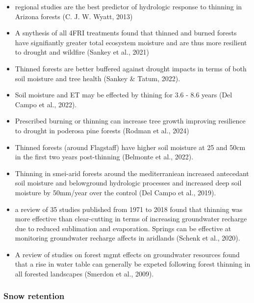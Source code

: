 \documentclass[
]{agujournal2019}
\begin{document}
\begin{itemize}
\item
  regional studies are the best predictor of hydrologic response to
  thinning in Arizona forests (C. J. W. Wyatt, 2013)
\item
  A snythesis of all 4FRI treatments found that thinned and burned
  forests have signifiantly greater total ecosystem moisture and are
  thus more resilient to drought and wildfire (Sankey et al., 2021)
\item
  Thinned forests are better buffered against drought impacts in terms
  of both soil moisture and tree health (Sankey \& Tatum, 2022).
\item
  Soil moisture and ET may be effected by thining for 3.6 - 8.6 years
  (Del Campo et al., 2022).
\item
  Prescribed burning or thinning can increase tree growth improving
  resilience to drought in poderosa pine forests (Rodman et al., 2024)
\item
  Thinned forests (around Flagstaff) have higher soil moisture at 25 and
  50cm in the first two years post-thinning (Belmonte et al., 2022).
\item
  Thinning in smei-arid forests around the mediterraniean increased
  antecedant soil moisture and belowground hydrologic processes and
  increased deep soil moisture by 50mm/year over the control (Del Campo
  et al., 2019).
\item
  a review of 35 studies published from 1971 to 2018 found that thinning
  was more effective than clear-cutting in terms of increasing
  groundwater recharge due to reduced sublimation and evaporation.
  Springs can be effective at monitoring groundwater recharge affects in
  aridlands (Schenk et al., 2020).
\item
  A review of studies on forest mgmt effects on groundwater resources
  found that a rise in water table can generally be expeted following
  forest thinning in all forested landscapes (Smerdon et al., 2009).
\end{itemize}

\subsubsection{Snow retention}\label{snow-retention}
\end{document}
